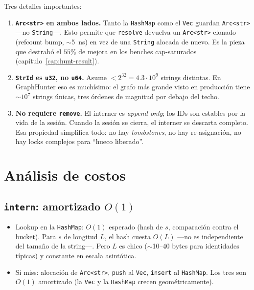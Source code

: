 \noindent
Tres detalles importantes:

\begin{enumerate}
    \item \textbf{\texttt{Arc<str>} en ambos lados.} Tanto la
    \texttt{HashMap} como el \texttt{Vec} guardan
    \texttt{Arc<str>} ---no \texttt{String}---. Esto permite que
    \texttt{resolve} devuelva un \texttt{Arc<str>} clonado (refcount
    bump, $\sim$5~ns) en vez de una \texttt{String} alocada de
    nuevo. Es la pieza que destrabó el \(55\%\) de mejora en los
    benches cap-saturados (capítulo~\ref{cap:hunt-result}).
    \item \textbf{\texttt{StrId} es \texttt{u32}, no \texttt{u64}.}
    Asume \(< 2^{32} = 4.3 \cdot 10^9\) strings distintas. En
    GraphHunter eso es muchísimo: el grafo más grande visto en
    producción tiene \(\sim 10^7\) strings únicas, tres órdenes de
    magnitud por debajo del techo.
    \item \textbf{No requiere \texttt{remove}.} El interner es
    \emph{append-only}; los IDs son estables por la vida de la
    sesión. Cuando la sesión se cierra, el interner se descarta
    completo. Esa propiedad simplifica todo: no hay
    \emph{tombstones}, no hay re-asignación, no hay locks complejos
    para ``hueco liberado''.
\end{enumerate}

\section{Análisis de costos}

\subsection{\texttt{intern}: amortizado \(O(1)\)}

\begin{itemize}
    \item Lookup en la \texttt{HashMap}: \(O(1)\) esperado (hash de
    \(s\), comparación contra el bucket). Para \(s\) de longitud
    \(L\), el hash cuesta \(O(L)\) ---no es independiente del
    tamaño de la string---. Pero \(L\) es chico ($\sim$10--40
    bytes para identidades típicas) y constante en escala
    asintótica.
    \item Si miss: alocación de \texttt{Arc<str>}, \texttt{push} al
    \texttt{Vec}, \texttt{insert} al \texttt{HashMap}. Los tres son
    \(O(1)\) amortizado (la \texttt{Vec} y la \texttt{HashMap}
    crecen geométricamente).
\end{itemize}

